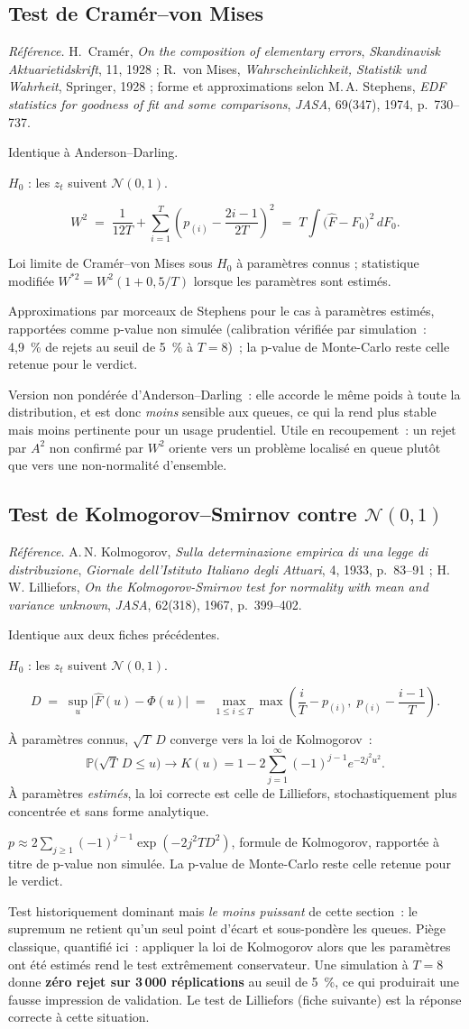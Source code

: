 \documentclass[a4paper,11pt]{article}
\newcommand{\refl}[1]{{\small\textcolor{maincolor!70!black}{\textit{Référence.} #1}}\par\smallskip}
\newcounter{ficheid}
\newenvironment{fiche}[1]{%
  \stepcounter{ficheid}%
  \phantomsection
  \subsection{#1}%
  \label{fiche:\theficheid}%
}{%
  \end{description}\vspace{0.5em}%
}
\newcommand{\Cadre}{%
  \begin{description}[leftmargin=0pt, style=unboxed, itemsep=3pt, topsep=3pt, parsep=2pt]%
  \item[\textcolor{financeblue}{\textbf{1. Cadre, notations et hypothèses de validité (non testées).}}]}
\newcommand{\Hzero}{\item[\textcolor{financeblue}{\textbf{2. Hypothèse nulle.}}]}
\newcommand{\Stat}{\item[\textcolor{financeblue}{\textbf{3. Statistique de test.}}]}
\newcommand{\Loi}{\item[\textcolor{financeblue}{\textbf{4. Loi sous $H_0$.}}]}
\newcommand{\Pval}{\item[\textcolor{financeblue}{\textbf{5. p-value.}}]}
\newcommand{\Usage}{\item[\textcolor{financeblue}{\textbf{6. Usage et limites.}}]}
\begin{document}
\begin{fiche}{Test de Cramér--von Mises}
\refl{H.~Cramér, \emph{On the composition of elementary errors}, \emph{Skandinavisk
Aktuarietidskrift}, 11, 1928 ; R.~von Mises, \emph{Wahrscheinlichkeit, Statistik und Wahrheit},
Springer, 1928 ; forme et approximations selon M.\,A. Stephens, \emph{EDF statistics for goodness
of fit and some comparisons}, \emph{JASA}, 69(347), 1974, p.~730--737.}
\Cadre
Identique à Anderson--Darling.
\Hzero
$H_0$ : les $z_t$ suivent $\mathcal{N}(0,1)$.
\Stat
\[
  W^2 \;=\; \frac{1}{12T} + \sum_{i=1}^{T}\left(p_{(i)} - \frac{2i-1}{2T}\right)^{2}
  \;=\; T\int \big(\hat F - F_0\big)^2\, dF_0 .
\]
\Loi
Loi limite de Cramér--von Mises sous $H_0$ à paramètres connus ; statistique modifiée
$W^{*2} = W^2(1 + 0{,}5/T)$ lorsque les paramètres sont estimés.
\Pval
Approximations par morceaux de Stephens pour le cas à paramètres estimés, rapportées comme
p-value non simulée (calibration vérifiée par simulation~: 4,9~\% de rejets au seuil de
5~\% à $T = 8$)~; la p-value de Monte-Carlo reste celle retenue pour le verdict.
\Usage
Version non pondérée d'Anderson--Darling~: elle accorde le même poids à toute la distribution, et
est donc \emph{moins} sensible aux queues, ce qui la rend plus stable mais moins pertinente pour
un usage prudentiel. Utile en recoupement~: un rejet par $A^2$ non confirmé par $W^2$ oriente vers
un problème localisé en queue plutôt que vers une non-normalité d'ensemble.
\end{fiche}

\begin{fiche}{Test de Kolmogorov--Smirnov contre $\mathcal{N}(0,1)$}
\refl{A.\,N. Kolmogorov, \emph{Sulla determinazione empirica di una legge di distribuzione},
\emph{Giornale dell'Istituto Italiano degli Attuari}, 4, 1933, p.~83--91 ; H.\,W. Lilliefors,
\emph{On the Kolmogorov-Smirnov test for normality with mean and variance unknown},
\emph{JASA}, 62(318), 1967, p.~399--402.}
\Cadre
Identique aux deux fiches précédentes.
\Hzero
$H_0$ : les $z_t$ suivent $\mathcal{N}(0,1)$.
\Stat
\[
  D \;=\; \sup_{u} \big|\hat F(u) - \Phi(u)\big|
    \;=\; \max_{1\le i\le T} \max\!\left(\frac{i}{T} - p_{(i)},\; p_{(i)} - \frac{i-1}{T}\right).
\]
\Loi
À paramètres connus, $\sqrt{T}\,D$ converge vers la loi de Kolmogorov~:
\[
  \mathbb{P}\big(\sqrt{T}\,D \le u\big) \longrightarrow K(u) = 1 - 2\sum_{j=1}^{\infty}(-1)^{j-1}e^{-2j^2u^2}.
\]
À paramètres \emph{estimés}, la loi correcte est celle de Lilliefors, stochastiquement plus
concentrée et sans forme analytique.
\Pval
$p \approx 2\sum_{j\ge1}(-1)^{j-1}\exp(-2j^2 T D^2)$, formule de Kolmogorov, rapportée à titre de
p-value non simulée. La p-value de Monte-Carlo reste celle retenue pour le verdict.
\Usage
Test historiquement dominant mais \emph{le moins puissant} de cette section~: le supremum ne
retient qu'un seul point d'écart et sous-pondère les queues. Piège classique, quantifié ici~:
appliquer la loi de Kolmogorov alors que les paramètres ont été estimés rend le
test extrêmement conservateur. Une simulation à $T = 8$ donne \textbf{zéro rejet sur 3\,000
réplications} au seuil de 5~\%, ce qui produirait une fausse impression de validation. Le test de
Lilliefors (fiche suivante) est la réponse correcte à cette situation.
\end{fiche}
\end{document}

